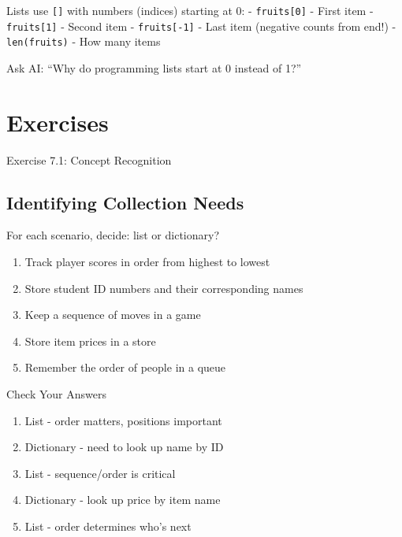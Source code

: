 \documentclass[
  letterpaper,
  DIV=11,
  numbers=noendperiod,
  oneside]{scrreprt}
\providecommand{\tightlist}{%
  \setlength{\itemsep}{0pt}\setlength{\parskip}{0pt}}\usepackage{longtable,booktabs,array}
\begin{document}
\begin{tcolorbox}[enhanced jigsaw, opacityback=0, colback=white, colframe=quarto-callout-note-color-frame, breakable, titlerule=0mm, coltitle=black, rightrule=.15mm, colbacktitle=quarto-callout-note-color!10!white, left=2mm, bottomtitle=1mm, bottomrule=.15mm, title=\textcolor{quarto-callout-note-color}{\faInfo}\hspace{0.5em}{Expression Explorer: List Indexing}, opacitybacktitle=0.6, toptitle=1mm, leftrule=.75mm, arc=.35mm, toprule=.15mm]

Lists use \texttt{{[}{]}} with numbers (indices) starting at 0: -
\texttt{fruits{[}0{]}} - First item - \texttt{fruits{[}1{]}} - Second
item - \texttt{fruits{[}-1{]}} - Last item (negative counts from end!) -
\texttt{len(fruits)} - How many items

Ask AI: ``Why do programming lists start at 0 instead of 1?''

\end{tcolorbox}

\section{Exercises}\label{exercises-7}

Exercise 7.1: Concept Recognition

\subsection{Identifying Collection
Needs}\label{identifying-collection-needs}

For each scenario, decide: list or dictionary?

\begin{enumerate}
\def\labelenumi{\arabic{enumi}.}
\tightlist
\item
  Track player scores in order from highest to lowest
\item
  Store student ID numbers and their corresponding names
\item
  Keep a sequence of moves in a game
\item
  Store item prices in a store
\item
  Remember the order of people in a queue
\end{enumerate}

Check Your Answers

\begin{enumerate}
\def\labelenumi{\arabic{enumi}.}
\tightlist
\item
  List - order matters, positions important
\item
  Dictionary - need to look up name by ID
\item
  List - sequence/order is critical
\item
  Dictionary - look up price by item name
\item
  List - order determines who's next
\end{enumerate}
\end{document}
